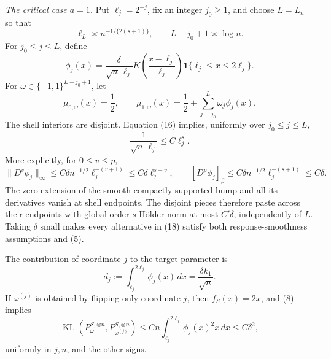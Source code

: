 \emph{The critical case \(a=1\).}
Put \(\ell_j=2^{-j}\), fix an integer \(j_0\ge1\), and choose \(L=L_n\) so that
\[
 \ell_L\asymp n^{-1/\{2(s+1)\}},
 \qquad L-j_0+1\asymp\log n.
\tag{16}
\]
For \(j_0\le j\le L\), define
\[
 \phi_j(x)=\frac{\delta}{\sqrt n\,\ell_j}
 K\!\left(\frac{x-\ell_j}{\ell_j}\right)
 \mathbf 1\{\ell_j\le x\le2\ell_j\}.
\tag{17}
\]
For \(\omega\in\{-1,1\}^{L-j_0+1}\), let
\[
 \mu_{0,\omega}(x)=\frac12,
 \qquad
 \mu_{1,\omega}(x)=\frac12+
 \sum_{j=j_0}^L\omega_j\phi_j(x).
\tag{18}
\]
The shell interiors are disjoint.  Equation (16) implies, uniformly over \(j_0\le j\le L\),
\[
 \frac1{\sqrt n\,\ell_j}\le C\ell_j^s.
\tag{19}
\]
More explicitly, for \(0\le v\le p\),
\[
 \lVert D^v\phi_j\rVert_\infty
 \le C\delta n^{-1/2}\ell_j^{-(v+1)}
 \le C\delta\ell_j^{s-v},
 \qquad
 [D^p\phi_j]_{\beta}
 \le C\delta n^{-1/2}\ell_j^{-(s+1)}
 \le C\delta.
\tag{20}
\]
The zero extension of the smooth compactly supported bump and all its derivatives vanish at shell endpoints.  The disjoint pieces therefore paste across their endpoints with global order-\(s\) H\"older norm at most \(C'\delta\), independently of \(L\).  Taking \(\delta\) small makes every alternative in (18) satisfy both response-smoothness assumptions and (5).

The contribution of coordinate \(j\) to the target parameter is
\[
 d_j:=\int_{\ell_j}^{2\ell_j}\phi_j(x)\,dx
 =\frac{\delta k_1}{\sqrt n}.
\tag{21}
\]
If \(\omega^{(j)}\) is obtained by flipping only coordinate \(j\), then \(f_S(x)=2x\), and (8) implies
\[
 \operatorname{KL}(P_\omega^{S,\otimes n},
                    P_{\omega^{(j)}}^{S,\otimes n})
 \le Cn\int_{\ell_j}^{2\ell_j}\phi_j(x)^2x\,dx
 \le C\delta^2,
\tag{22}
\]
uniformly in \(j,n\), and the other signs.

